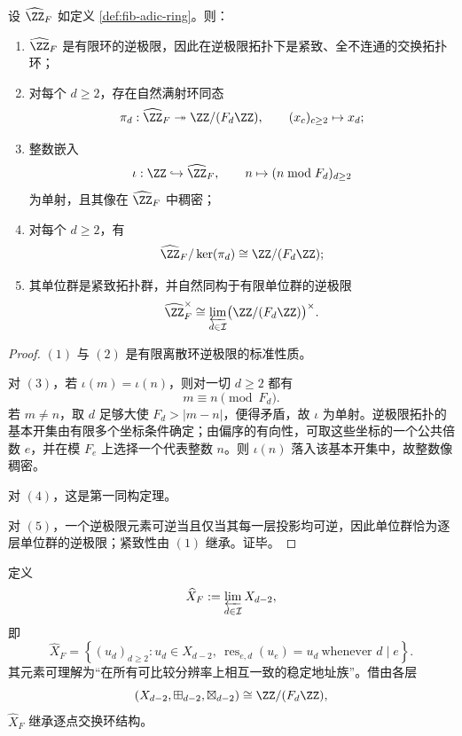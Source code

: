 \begin{proposition}\label{prop:fib-adic-basic}
设 \(\widehat{\ZZ}_F\) 如定义 \ref{def:fib-adic-ring}。则：
\begin{enumerate}
  \item \(\widehat{\ZZ}_F\) 是有限环的逆极限，因此在逆极限拓扑下是紧致、全不连通的交换拓扑环；
  \item 对每个 \(d\ge 2\)，存在自然满射环同态
  \[
  \pi_d:\widehat{\ZZ}_F\twoheadrightarrow \ZZ/(F_d\ZZ),
  \qquad
  (x_c)_{c\ge 2}\mapsto x_d;
  \]
  \item 整数嵌入
  \[
  \iota:\ZZ\hookrightarrow \widehat{\ZZ}_F,
  \qquad
  n\mapsto (n\bmod F_d)_{d\ge 2}
  \]
  为单射，且其像在 \(\widehat{\ZZ}_F\) 中稠密；
  \item 对每个 \(d\ge 2\)，有
  \[
  \widehat{\ZZ}_F/\ker(\pi_d)\cong \ZZ/(F_d\ZZ);
  \]
  \item 其单位群是紧致拓扑群，并自然同构于有限单位群的逆极限
  \[
  \widehat{\ZZ}_F^\times\cong
  \varprojlim_{d\in\mathcal I}\bigl(\ZZ/(F_d\ZZ)\bigr)^\times.
  \]
\end{enumerate}
\end{proposition}
\begin{proof}
\((1)\) 与 \((2)\) 是有限离散环逆极限的标准性质。

对 \((3)\)，若 \(\iota(m)=\iota(n)\)，则对一切 \(d\ge 2\) 都有
\[
m\equiv n\pmod{F_d}.
\]
若 \(m\neq n\)，取 \(d\) 足够大使 \(F_d>|m-n|\)，便得矛盾，故 \(\iota\) 为单射。逆极限拓扑的基本开集由有限多个坐标条件确定；由偏序的有向性，可取这些坐标的一个公共倍数 \(e\)，并在模 \(F_e\) 上选择一个代表整数 \(n\)。则 \(\iota(n)\) 落入该基本开集中，故整数像稠密。

对 \((4)\)，这是第一同构定理。

对 \((5)\)，一个逆极限元素可逆当且仅当其每一层投影均可逆，因此单位群恰为逐层单位群的逆极限；紧致性由 \((1)\) 继承。证毕。
\end{proof}

\begin{definition}[逆极限地址空间]
定义
\[
\widehat X_F
:=
\varprojlim_{d\in\mathcal I} X_{d-2},
\]
即
\[
\widehat X_F
=
\left\{
(u_d)_{d\ge 2}:
u_d\in X_{d-2},\
\operatorname{res}_{e,d}(u_e)=u_d\ \text{whenever } d\mid e
\right\}.
\]
其元素可理解为“在所有可比较分辨率上相互一致的稳定地址族”。借由各层
\[
(X_{d-2},\boxplus_{d-2},\boxtimes_{d-2})\cong \ZZ/(F_d\ZZ),
\]
\(\widehat X_F\) 继承逐点交换环结构。
\end{definition}

